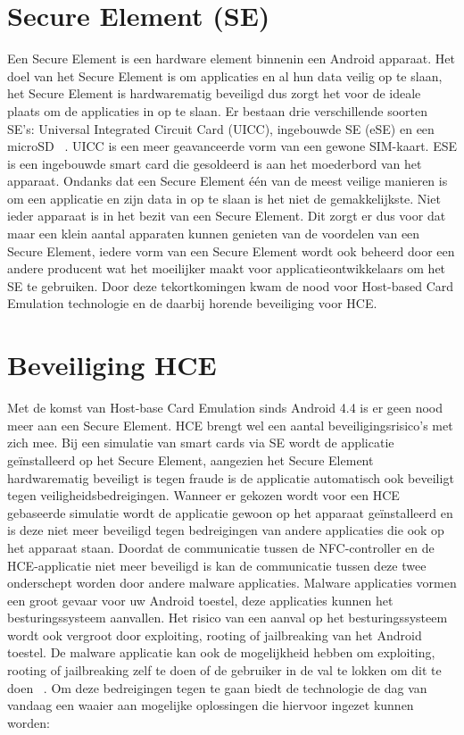 \section{Secure Element (SE)}
\label{sec:SE}
Een Secure Element is een hardware element binnenin een Android apparaat. Het doel van het Secure Element is om applicaties en al hun data veilig op te slaan, het Secure Element is hardwarematig beveiligd dus zorgt het voor de ideale plaats om de applicaties in op te slaan. Er bestaan drie verschillende soorten SE's: Universal Integrated Circuit Card (UICC), ingebouwde SE (eSE) en een microSD ~\autocite{Borko2014}. UICC is een meer geavanceerde vorm van een gewone SIM-kaart. ESE is een ingebouwde smart card die gesoldeerd is aan het moederbord van het apparaat. Ondanks dat een Secure Element één van de meest veilige manieren is om een applicatie en zijn data in op te slaan is het niet de gemakkelijkste. Niet ieder apparaat is in het bezit van een Secure Element. Dit zorgt er dus voor dat maar een klein aantal apparaten kunnen genieten van de voordelen van een Secure Element, iedere vorm van een Secure Element wordt ook beheerd door een andere producent wat het moeilijker maakt voor applicatieontwikkelaars om het SE te gebruiken. Door deze tekortkomingen kwam de nood voor Host-based Card Emulation technologie en de daarbij horende beveiliging voor HCE.

\section{Beveiliging HCE}
\label{sec:Beveiliging}
Met de komst van Host-base Card Emulation sinds Android 4.4 is er geen nood meer aan een Secure Element. HCE brengt wel een aantal beveiligingsrisico's met zich mee. Bij een simulatie van smart cards via SE wordt de applicatie geïnstalleerd op het Secure Element, aangezien het Secure Element hardwarematig beveiligt is tegen fraude is de applicatie automatisch ook beveiligt tegen veiligheidsbedreigingen. Wanneer er gekozen wordt voor een HCE gebaseerde simulatie wordt de applicatie gewoon op het apparaat geïnstalleerd en is deze niet meer beveiligd tegen bedreigingen van andere applicaties die ook op het apparaat staan.
Doordat de communicatie tussen de NFC-controller en de HCE-applicatie niet meer beveiligd is kan de communicatie tussen deze twee onderschept worden door andere malware applicaties. Malware applicaties vormen een groot gevaar voor uw Android toestel, deze applicaties kunnen het besturingssysteem aanvallen. Het risico van een aanval op het besturingssysteem wordt ook vergroot door exploiting, rooting of jailbreaking van het Android toestel. De malware applicatie kan ook de mogelijkheid hebben om exploiting, rooting of jailbreaking zelf te doen of de gebruiker in de val te lokken om dit te doen ~\autocite{SCA2014}. 
Om deze bedreigingen tegen te gaan biedt de technologie de dag van vandaag een waaier aan mogelijke oplossingen die hiervoor ingezet kunnen worden:

